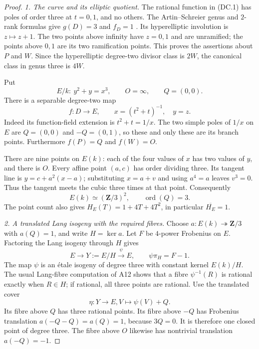 \begin{proof}
\emph{1. The curve and its elliptic quotient.}
The rational function in (DC.1) has poles of order three
at $t=0,1$, and no others.  The Artin--Schreier genus and
$2$-rank formulas give $g(D)=3$ and $f_D=1$
\cite[Lemma~2.6, p.~712]{PriesZhu2012}.
Its hyperelliptic involution is $z\mapsto z+1$.
The two points above infinity have $z=0,1$ and are
unramified; the points above $0,1$ are its two ramification
points.  This proves the assertions about $P$ and $W$.
Since the hyperelliptic degree-two divisor class is $2W$,
the canonical class in genus three is $4W$.

Put
\[
 E/k:\ y^2+y=x^3,\qquad O=\infty,\qquad Q=(0,0).
\]
There is a separable degree-two map
\[
 f:D\longrightarrow E,\qquad
                 x=(t^2+t)^{-1},\quad y=z.
\tag{DC.4}
\]
Indeed its function-field extension is
$t^2+t=1/x$.  The two simple poles of $1/x$ on $E$ are
$Q=(0,0)$ and $-Q=(0,1)$, so these and only these are its
branch points.  Furthermore $f(P)=Q$ and $f(W)=O$.

There are nine points on $E(k)$: each of the four values
of $x$ has two values of $y$, and there is $O$.
Every affine point $(a,c)$ has order dividing three.
Its tangent line is $y=c+a^2(x-a)$; substituting
$x=a+v$ and using $a^4=a$ leaves $v^3=0$.
Thus the tangent meets the cubic three times at that point.
Consequently
\[
              E(k)\simeq(\mathbf Z/3)^2,
              \qquad \operatorname{ord}(Q)=3.
\tag{DC.5}
\]
The point count also gives
$H_E(T)=1+4T+4T^2$, in particular $\overline{H_E}=1$.

\emph{2. A translated Lang isogeny with the required fibres.}
Choose $a:E(k)\twoheadrightarrow\mathbf Z/3$ with $a(Q)=1$,
and write $H=\ker a$.
Let $F$ be $4$-power Frobenius on $E$.  Factoring the Lang
isogeny through $H$ gives
\[
 E\longrightarrow Y:=E/H\xrightarrow{\psi}E,
             \qquad \psi\pi_H=F-1.
\tag{DC.6}
\]
The map $\psi$ is an \'etale isogeny of degree three with
constant kernel $E(k)/H$.  The usual Lang-fibre computation
of A12 shows that a fibre $\psi^{-1}(R)$ is rational exactly
when $R\in H$; if rational, all three points are rational.
Use the translated cover
\[
                  \eta:Y\longrightarrow E,
                           V\longmapsto\psi(V)+Q.
\tag{DC.7}
\]
Its fibre above $Q$ has three rational points.  Its fibre
above $-Q$ has Frobenius translation
$a(-Q-Q)=a(Q)=1$, because $3Q=0$.
It is therefore one closed point of degree three.
The fibre above $O$ likewise has nontrivial translation
$a(-Q)=-1$.


\end{proof}
